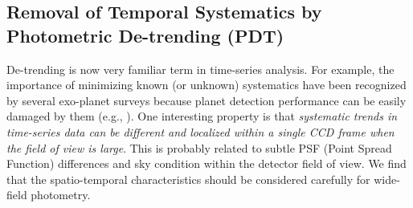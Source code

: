 \subsection{Removal of Temporal Systematics by Photometric De-trending (PDT)}
De-trending is now very familiar term in time-series analysis.  For example, the importance of minimizing known (or unknown) systematics have been recognized by several exo-planet surveys because planet detection performance can be easily damaged by them (e.g., \citealt{kov05, tam05, pon06}).  One interesting property is that {\itshape systematic trends in time-series data can be different and localized within a single CCD frame when the field of view is large}.  This is probably related to subtle PSF (Point Spread Function) differences and sky condition within the detector field of view.  We find that the spatio-temporal characteristics should be considered carefully for wide-field photometry.

